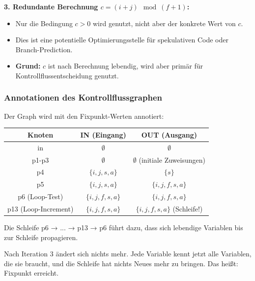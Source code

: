 \documentclass[11pt,a4paper]{article}
\begin{document}
\textbf{3. Redundante Berechnung $c = (i+j) \mod (f+1)$:}
\begin{itemize}
    \item Nur die Bedingung $c > 0$ wird genutzt, nicht aber der konkrete Wert von $c$.
    \item Dies ist eine potentielle Optimierungsstelle für spekulativen Code oder Branch-Prediction.
    \item \textbf{Grund:} $c$ ist nach Berechnung lebendig, wird aber primär für Kontrollflussentscheidung genutzt.
\end{itemize}

\subsubsection*{Annotationen des Kontrollflussgraphen}

Der Graph wird mit den Fixpunkt-Werten annotiert:

\begin{center}
\begin{tabular}{|c|c|c|}
\hline
\textbf{Knoten} & \textbf{IN (Eingang)} & \textbf{OUT (Ausgang)} \\
\hline
in & $\emptyset$ & $\emptyset$ \\
\hline
p1-p3 & $\emptyset$ & $\emptyset$ (initiale Zuweisungen) \\
\hline
p4 & $\{i, j, s, a\}$ & $\{s\}$ \\
\hline
p5 & $\{i, j, s, a\}$ & $\{i, j, f, s, a\}$ \\
\hline
p6 (Loop-Test) & $\{i, j, f, s, a\}$ & $\{i, j, f, s, a\}$ \\
\hline
p13 (Loop-Increment) & $\{i, j, f, s, a\}$ & $\{i, j, f, s, a\}$ (Schleife!) \\
\hline
\end{tabular}
\end{center}

Die Schleife p6 → ... → p13 → p6 führt dazu, dass sich lebendige Variablen bis zur Schleife propagieren.

Nach Iteration 3 ändert sich nichts mehr. Jede Variable kennt jetzt alle Variablen, die sie braucht, und die Schleife hat nichts Neues mehr zu bringen. Das heißt: Fixpunkt erreicht.
\end{document}
